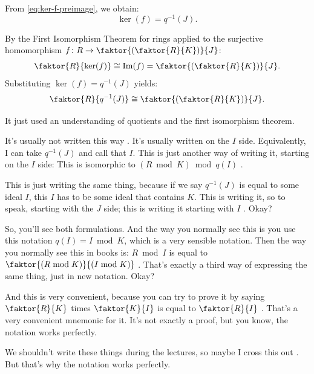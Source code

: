 \begin{content}
From \eqref{eq:ker-f-preimage}, we obtain:
\begin{equation}\label{eq:kernel-f-identity}
\ker(f) = q^{-1}(J).
\end{equation}

By the First Isomorphism Theorem for rings applied to the surjective homomorphism $f \colon R \to \faktor{(\faktor{R}{K})}{J}$:
\begin{equation}\label{eq:first-isom-quotient}
\faktor{R}{\ker(f)} \cong \operatorname{Im}(f) = \faktor{\left(\faktor{R}{K}\right)}{J}.
\end{equation}
Substituting $\ker(f) = q^{-1}(J)$ yields:
\begin{equation}\label{eq:third-isom-j-form}
\faktor{R}{q^{-1}(J)} \cong \faktor{\left(\faktor{R}{K}\right)}{J}.
\end{equation}
\end{content}

\begin{speech}[00:07:38 - 00:09:12]
It just used an understanding of quotients and the first isomorphism theorem.

It's usually not written this way . It's usually written on the $I$ side. Equivalently, I can take $q^{-1}(J)$ and call that $I$. This is just another way of writing it, starting on the $I$ side: This is isomorphic to $(R \bmod K) \bmod q(I)$ .

This is just writing the same thing, because if we say $q^{-1}(J)$ is equal to some ideal $I$, this $I$ has to be some ideal that contains $K$. This is writing it, so to speak, starting with the $J$ side; this is writing it starting with $I$ . Okay?

So, you'll see both formulations. And the way you normally see this is you use this notation $q(I) = I \bmod K$, which is a very sensible notation. Then the way you normally see this in books is: $R \bmod I$ is equal to $\faktor{(R \bmod K)}{(I \bmod K)}$ . That's exactly a third way of expressing the same thing, just in new notation. Okay?

And this is very convenient, because you can try to prove it by saying $\faktor{R}{K}$ times $\faktor{K}{I}$ is equal to $\faktor{R}{I}$ . That's a very convenient mnemonic for it. It's not exactly a proof, but you know, the notation works perfectly.

We shouldn't write these things during the lectures, so maybe I cross this out . But that's why the notation works perfectly.
\end{speech}

